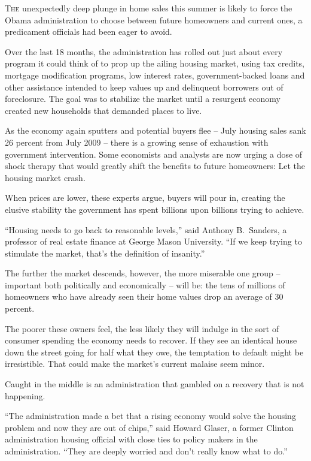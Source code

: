 ﻿\documentclass[12pt]{article}
\begin{document}
\lettrine{T}{he} unexpectedly deep plunge in home sales this summer is
likely to force the Obama administration to choose between future homeowners and current ones, a
predicament officials had been eager to avoid.

Over the last 18 months, the administration has rolled out just about every program it could think
of to prop up the ailing housing market, using tax credits, mortgage modification programs, low
interest rates, government-backed loans and other assistance intended to keep values up and
delinquent borrowers out of foreclosure. The goal was to stabilize the market until a resurgent
economy created new households that demanded places to live.

As the economy again sputters and potential buyers flee -- July housing sales sank 26 percent from
July 2009 -- there is a growing sense of exhaustion with government intervention. Some economists
and analysts are now urging a dose of shock therapy that would greatly shift the benefits to future
homeowners: Let the housing market crash.

When prices are lower, these experts argue, buyers will pour in, creating the elusive stability the
government has spent billions upon billions trying to achieve.

``Housing needs to go back to reasonable levels,'' said Anthony B.~Sanders, a professor of real
estate finance at George Mason University. ``If we keep trying to stimulate the market, that's the
definition of insanity.''

The further the market descends, however, the more miserable one group -- important both politically
and economically -- will be: the tens of millions of homeowners who have already seen their home
values drop an average of 30 percent.

The poorer these owners feel, the less likely they will indulge in the sort of consumer spending the
economy needs to recover. If they see an identical house down the street going for half what they
owe, the temptation to default might be irresistible. That could make the market's current malaise
seem minor.

Caught in the middle is an administration that gambled on a recovery that is not happening.

``The administration made a bet that a rising economy would solve the housing problem and now they
are out of chips,'' said Howard Glaser, a former Clinton administration housing official with close
ties to policy makers in the administration. ``They are deeply worried and don't really know what to
do.''
\end{document}
